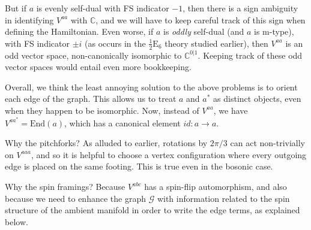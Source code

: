 \documentclass[12pt,a4paper]{article}
\newcommand{\mce}{\mathcal{E}}
\newcommand{\cc}{\mathbb{C}}
\newcommand{\mcg}{\mathcal{G}}
\newcommand{\mch}{\mathcal{H}}
\newcommand{\mcc}{\mathcal{C}}
\newcommand\be            {\begin{equation}}
\newcommand\ee            {\end{equation}}
\newcommand{\End}{\text{End}}
\newcommand{\dave}[1]{{\color{ao(english)}\footnotesize{(DA) #1}}}
\newcommand{\halfesix}{\frac{1}{2}\text{E}_6}
\begin{document}
But if $a$ is evenly self-dual with FS indicator $-1$, then there is a sign ambiguity in identifying $V^{aa}$ with $\cc$, and we will have to
keep careful track of this sign when defining the Hamiltonian.
Even worse, if $a$ is {\it oddly} self-dual (and $a$ is m-type), with FS indicator $\pm i$ (as occurs in the $\halfesix$ theory studied earlier), then $V^{aa}$ is an odd vector space, 
non-canonically isomorphic to $\cc^{0|1}$.
Keeping track of these odd vector spaces would entail even more bookkeeping.

Overall, we think the least annoying solution to the above problems is to orient each edge of the graph.
This allows us to treat $a$ and $a^*$ as distinct objects, even when they happen to be isomorphic.
Now, instead of $V^{aa}$, we have $V^{aa^*} = \End(a)$, which has a canonical element $id: a\to a$.

Why the pitchforks? As alluded to earlier, rotations by $2\pi/3$ can act non-trivially on $V^{aaa}$, and so it is helpful to choose a vertex configuration where every outgoing edge is placed on the same footing. 
This is true even in the bosonic case.

Why the spin framings?
Because $V^{abc}$ has a spin-flip automorphism, and also because we need to 
enhance the graph $\mcg$ with information related to the spin structure of the ambient manifold 
in order to write the edge terms, as explained below.

\end{document}

